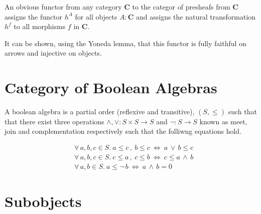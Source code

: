 \documentclass[a4paper,12pt]{article}
\begin{document}
An obvious functor from any category \textbf{C} to the categor of presheafs from
\textbf{C} assigns the functor $h^{A}$ for all objects $A:\textbf{C}$ and
assigns the natural transformation $h^{f}$ to all morphisms $f$ in \textbf{C}.

It can be shown, using the Yoneda lemma, that this functor is fully faithful on
arrows and injective on objects.

\section{Category of Boolean Algebras}
A boolean algebra is a partial order (reflexive and transitive), $(S, \leq)$ such that that
there exist three operations $\land, \lor: S\times S \rightarrow S$  and $\neg:
S \rightarrow S$ known as meet, join and complementation respectively such that
the folliwng equations hold.

\begin{align*}
    &\forall \, a, b, c \in S. \ a \leq c \, , \ b \leq c \ \Leftrightarrow \ a \,
    \lor \, b \leq c \\
    &\forall \, a, b, c  \in S. \ c \leq a \, , \ c \leq b \ \Leftrightarrow \ c
    \leq a \, \land \, b \\
    &\forall \, a, b \in S. \ a \leq \neg \, b \ \Leftrightarrow \ a \, \land \,
    b = 0
\end{align*}

\section{Subobjects}
\end{document}
